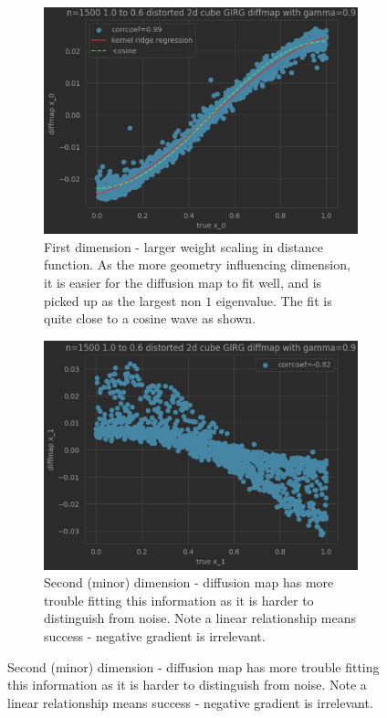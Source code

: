 \begin{figure}
  \centering

  \begin{subfigure}{0.49\textwidth}
    \centering
    \includegraphics[width=\linewidth]{figures/2d_distorted_diffmap_plot_major.png}
    \caption{First dimension - larger weight scaling in distance function. As the more geometry influencing dimension, it is easier for the diffusion map to fit well, and is picked up as the largest non $1$ eigenvalue. The fit is quite close to a cosine wave as shown.}
    \label{fig:2d_distorted_major}
  \end{subfigure}
  \hfill
  \begin{subfigure}{0.49\textwidth}
    \centering
    \includegraphics[width=\linewidth]{figures/2d_distorted_diffmap_plot_minor.png}
    \caption{Second (minor) dimension - diffusion map has more trouble fitting this information as it is harder to distinguish from noise. Note a linear relationship means success - negative gradient is irrelevant.}
    \label{fig:2d_distorted_minor}
  \end{subfigure}



\end{figure}
